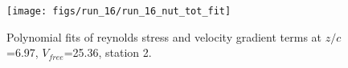 \begin{figure}[H]
\centering
\texttt{[image: figs/run\_16/run\_16\_nut\_tot\_fit]}
\caption{Polynomial fits of reynolds stress and velocity gradient terms at $z/c$=6.97, $V_{free}$=25.36, station 2.}
\label{fig:run_16_nut_tot_fit}
\end{figure}


